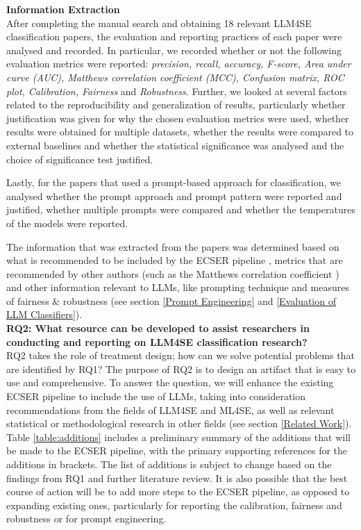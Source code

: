 \documentclass[a4paper]{article}
\newcommand{\emphasize}[1]{\textbf{#1}}
\begin{document}
\textbf{Information Extraction}\\
After completing the manual search and obtaining 18 relevant LLM4SE classification papers, the evaluation and reporting practices of each paper were analysed and recorded. In particular, we recorded whether or not the following evaluation metrics were reported: \textit{precision, recall, accuracy, F-score, Area under curve (AUC), Matthews correlation coefficient (MCC), Confusion matrix, ROC plot, Calibration, Fairness} and \textit{Robustness}.
Further, we looked at several factors related to the reproducibility and generalization of results, particularly whether justification was given for why the chosen evaluation metrics were used, whether results were obtained for multiple datasets, whether the results were compared to external baselines and whether the statistical significance was analysed and the choice of significance test justified. 

Lastly, for the papers that used a prompt-based approach for classification, we analysed whether the prompt approach and prompt pattern were reported and justified, whether multiple prompts were compared and whether the temperatures of the models were reported.

The information that was extracted from the papers was determined based on what is recommended to be included by the ECSER pipeline \cite{Dellanna2022}, metrics that are recommended by other authors (such as the Matthews correlation coefficient \cite{Chicco2020,Foody2023,Yao2020}) and other information relevant to LLMs, like prompting technique and measures of fairness \& robustness (see section \ref{Prompt Engineering} and \ref{Evaluation of LLM Classifiers}). \\




\emphasize{RQ2: What resource can be developed to assist researchers in conducting and reporting on LLM4SE classification research?}\\
RQ2 takes the role of treatment design; how can we solve potential problems that are identified by RQ1? The purpose of RQ2 is to design an artifact that is easy to use and comprehensive. To answer the question, we will enhance the existing ECSER pipeline \cite{Dellanna2022} to include the use of LLMs, taking into consideration recommendations from the fields of LLM4SE and ML4SE, as well as relevant statistical or methodological research in other fields (see section \ref{Related Work}). Table \ref{table:additions} includes a preliminary summary of the additions that will be made to the ECSER pipeline, with the primary supporting references for the additions in brackets. The list of additions is subject to change based on the findings from RQ1 and further literature review. It is also possible that the best course of action will be to add more steps to the ECSER pipeline, as opposed to expanding existing ones, particularly for reporting the calibration, fairness and robustness or for prompt engineering.
\end{document}
